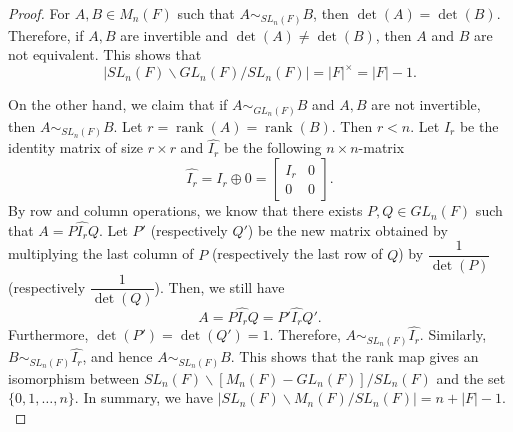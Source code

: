 \documentclass[10pt,a4paper]{amsart}
\DeclareMathOperator{\rank}{\text{rank}}
\begin{document}
\begin{proof}
    For $A,B \in M_n(F)$ such that $A \sim_{SL_n(F)} B$, then $\det(A)=\det(B).$ Therefore, if $A,B$ are invertible and $\det(A) \neq \det(B)$, then $A$ and $B$ are not equivalent. This shows that 
    \[ |SL_n(F) \backslash GL_n(F) \slash SL_n(F)|=|F|^{\times}=|F|-1.\]
    
    
    
    On the other hand, we claim that if $A \sim_{GL_n(F)} B$ and $A,B$ are not invertible, then $A \sim_{SL_n(F)} B.$ Let $r=\rank(A)=\rank(B).$ Then $r<n$. Let $I_r$ be the identity matrix of size $r\times r$ and $\widehat{I_r}$ be the following $n\times n$-matrix 
    \[ 
\widehat{I_r} = I_r\oplus 0 = \begin{bmatrix} I_r & 0 \\ 0 & 0 \end{bmatrix}. \]
By row and column operations, we know that there exists $P,Q \in GL_n(F)$ such that $A=P \widehat{I_r} Q.$ Let $P'$ (respectively $Q'$) be the new matrix obtained by multiplying the last column of $P$ (respectively the last row of $Q$) by $\dfrac{1}{\det(P)}$ (respectively $\dfrac{1}{\det(Q)}$). Then, we still have 
\[ A = P\widehat{I_r} Q = P' \widehat{I_r} Q'.\]
Furthermore, $\det(P')=\det(Q')=1.$ Therefore, $A \sim_{SL_n(F)} \widehat{I_r}.$ Similarly, $B \sim_{SL_n(F)} \widehat{I_r}$, and hence $A \sim_{SL_n(F)} B.$ This shows that the rank map gives an isomorphism between $SL_n(F) \backslash [M_n(F)-GL_n(F)] \slash SL_n(F)$ and the set $\{0, 1, \ldots, n\}.$ In summary, we have  $|SL_n(F) \backslash M_n(F) \slash SL_n(F)|=n+|F|-1.$

\end{proof}
\end{document}
